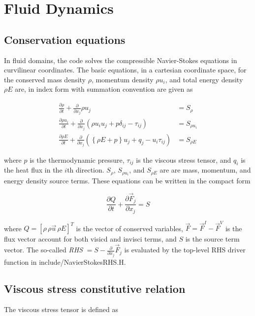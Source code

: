 \hypertarget{theory_navierStokes}{}\section{Fluid Dynamics}\label{theory_navierStokes}
\hypertarget{theory_conserve}{}\subsection{Conservation equations}\label{theory_conserve}
In fluid domains, the code solves the compressible Navier-\/\+Stokes equations in curvilinear coordinates. The basic equations, in a cartesian coordinate space, for the conserved mass density $\rho$, momentum density $\rho u_i$, and total energy density $\rho E$ are, in index form with summation convention are given as

\[ \begin{align} \frac{\partial \rho}{\partial t} + \frac{\partial }{\partial x_j} \rho u_j &= S_\rho \\ \frac{\partial \rho u_i}{\partial t} + \frac{\partial}{\partial x_j}\left(\rho u_i u_j + p\delta_{ij} - \tau_{ij}\right) &= S_{\rho u_i} \\ \frac{\partial \rho E}{\partial t} + \frac{\partial}{\partial x_j}\left(\left\{\rho E + p\right\}u_j + q_j - u_i \tau_{ij}\right) &= S_{\rho E} \end{align} \]

where $p$ is the thermodynamic pressure, $\tau_{ij}$ is the viscous stress tensor, and $q_i$ is the heat flux in the $i$th direction. $S_\rho$, $S_{\rho u_i}$, and $S_{\rho E}$ are are mass, momentum, and energy density source terms. These equations can be written in the compact form

\[ \frac{\partial Q}{\partial t} + \frac{\partial \vec{F}_j}{\partial x_j} = S \]

where $Q = [\rho\,\rho \vec{u}\,\rho E]^T$ is the vector of conserved variables, $\vec{F} = \vec{F}^I - \vec{F}^V$ is the flux vector account for both visicd and invisci terms, and $S$ is the source term vector. The so-\/called {\itshape R\+HS} $ = S - \frac{\partial}{\partial x_j}\vec{F}_j$ is evaluated by the top-\/level R\+HS driver function in include/\+Navier\+Stokes\+R\+H\+S.\+H.\hypertarget{theory_viscous}{}\subsection{Viscous stress constitutive relation}\label{theory_viscous}
The viscous stress tensor is defined as

